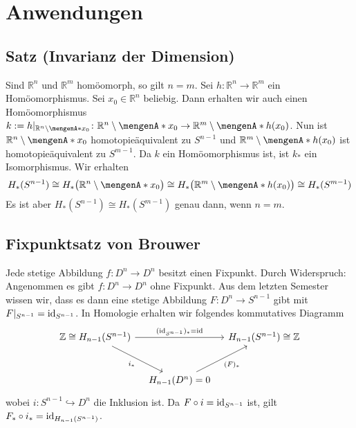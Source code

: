 \section{Anwendungen} %
\label{sec:10}

\subsection[Satz: Invarianz der Dimension]{Satz (Invarianz der Dimension)} %
\label{sub:101}
Sind $\mathds{R}^n$ und $\mathds{R}^m$ homöomorph, so gilt $n=m$.
Sei $h \colon \mathds{R}^n \to \mathds{R}^m$ ein Homöomorphismus. Sei $x_0 \in \mathds{R}^n$ beliebig. Dann erhalten wir auch einen Homöomorphismus 
$k := h|_{\mathds{R}^n\setminus \set{x_0}} \colon \mathds{R}^n \setminus \set{x_0} \to \mathds{R}^m  \setminus \set{h(x_0)}$. Nun ist $\mathds{R}^n \setminus \set{x_0}$
homotopieäquivalent zu $S^{n-1}$ und $\mathds{R}^{m}\setminus\set{h(x_0)}$ ist homotopieäquivalent zu $S^{m-1}$. Da $k$ ein Homöomorphismus ist, ist $k_*$ ein Isomorphismus.
Wir erhalten
\begin{align*}
	H_*(S^{n-1}) \cong H_* \enbrace[\big]{\mathds{R}^n \setminus \set{x_0}}  \cong H_* \enbrace[\big]{\mathds{R}^m \setminus \set{h(x_0)}} \cong H_*(S^{m-1})
\end{align*}
Es ist aber $H_*(S^{n-1}) \cong H_*(S^{m-1})$ genau dann, wenn $n=m$. \bewende

\subsection{Fixpunktsatz von Brouwer} %
\label{sub:102}
Jede stetige Abbildung $f \colon D^n \to D^n$ besitzt einen Fixpunkt.
Durch Widerspruch: Angenommen es gibt $f\colon D^n \to D^n$ ohne Fixpunkt. Aus dem letzten Semester wissen wir, dass es dann eine stetige Abbildung $F\colon D^n \to S^{n-1}$ 
gibt mit $F|_{S^{n-1}} = \operatorname{id}_{S^{n-1}}$. In Homologie erhalten wir folgendes kommutatives Diagramm 
\[
	\begin{tikzcd}[row sep=large, column sep=1em]
		\mathds{Z}\cong H_{n-1}(S^{n-1}) \arrow[rr,"(\id_{S^{n-1}})_* = \id" ] \arrow[dr,"i_*"'] && H_{n-1}(S^{n-1}) \cong \mathds{Z} \\
		& H_{n-1}(D^n)=0  \urar["(F)_*"']&
	\end{tikzcd}
\]
wobei $i\colon S^{n-1} \hookrightarrow D^n$ die Inklusion ist. Da $F \circ i = \operatorname{id}_{S^{n-1}}$ ist, gilt $F_* \circ i_* = \operatorname{id}_{H_{n-1}(S^{n-1})}$. \light \bewende
